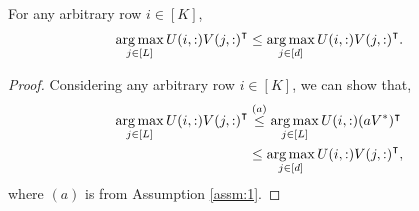 \documentclass[twoside]{article}
\begin{document}
\begin{lemma}
For any arbitrary row $i\in[K]$, 
\begin{align*}
\mathop{\rm arg\,max}_{j\in[L]} U(i,:){V(j,:)}^{\intercal} \leq \mathop{\rm arg\,max}_{j\in[d]} U(i,:){V(j,:)}^{\intercal} . 
\end{align*}
\end{lemma}

\begin{proof}
Considering any arbitrary row $i\in [K]$, we can show that,
\begin{align*}
\mathop{\rm arg\,max}_{j\in[L]} U(i,:){V(j,:)}^{\intercal}  & \overset{(a)}{\leq} \mathop{\rm arg\,max}_{j\in[L]} U(i,:)(aV^*)^{\intercal}  \\
& \leq \mathop{\rm arg\,max}_{j\in[d]}U(i,:){V(j,:)}^{\intercal}  ,
\end{align*}
where $(a)$ is from Assumption \ref{assm:1}.
\end{proof}



%


\end{document}
